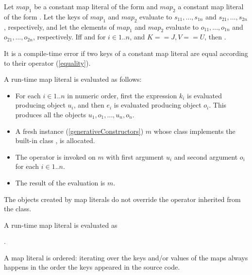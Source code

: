 \documentclass[makeidx]{article}
\begin{document}
{\LMHash{}%
Let $map_1$ be a constant map literal of the form
and $map_2$ a constant map literal of the form
.
Let the keys of $map_1$ and $map_2$ evaluate to
$s_{11}, \ldots, s_{1n}$ and $s_{21}, \ldots, s_{2n}$, respectively,
and let the elements of $map_1$ and $map_2$ evaluate to
$o_{11}, \ldots, o_{1n}$ and $o_{21}, \ldots, o_{2n}$, respectively.
If{}f
 and
for $i \in 1 .. n$, and $K == J, V == U$, then .


\LMHash{}%
It is a compile-time error if two keys of a constant map literal are equal
according to their \lit{==} operator (\ref{equality}).

\LMHash{}%
A run-time map literal
is evaluated as follows:
\begin{itemize}
\item
  For each $i \in 1 .. n$ in numeric order,
  first the expression $k_i$ is evaluated producing object $u_i$,
  and then $e_i$ is evaluated producing object $o_i$.
  This produces all the objects $u_1, o_1, \ldots, u_n, o_n$.
\item
  A fresh instance (\ref{generativeConstructors}) $m$
  whose class implements the built-in class ,
  is allocated.
\item
  The operator \lit{[]=} is invoked on $m$
  with first argument $u_i$ and second argument $o_i$
  for each $i \in 1 .. n$.
\item
  The result of the evaluation is $m$.
\end{itemize}

\LMHash{}%
The objects created by map literals do not override
the \lit{==} operator inherited from the  class.

\LMHash{}%
A run-time map literal
is evaluated as

.

\LMHash{}%
A map literal is ordered:
iterating over the keys and/or values of the maps
always happens in the order the keys appeared in the source code.

}
\end{document}
